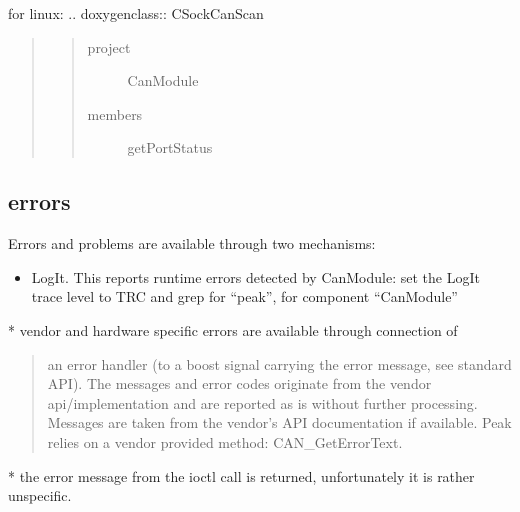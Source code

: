 \documentclass[a4paper,10pt,english]{sphinxmanual}
\begin{document}
\sphinxAtStartPar
for linux:
.. doxygenclass:: CSockCanScan
\begin{quote}
\begin{quote}\begin{description}
\item[{project}] \leavevmode
\sphinxAtStartPar
CanModule

\item[{members}] \leavevmode
\sphinxAtStartPar
getPortStatus

\end{description}\end{quote}
\end{quote}


\subsection{errors}
\label{\detokenize{vendors/peak:errors}}
\sphinxAtStartPar
Errors and problems are available through two mechanisms:
\begin{itemize}
\item {} 
\sphinxAtStartPar
LogIt. This reports runtime errors detected by CanModule:
set the LogIt trace level to TRC and grep for “peak”, for component “CanModule”

\end{itemize}

\sphinxAtStartPar
{}
* vendor and hardware specific errors are available through connection of
\begin{quote}

\sphinxAtStartPar
an error handler (to a boost signal carrying the error message, see standard API).
The messages and error codes originate from the vendor api/implementation and are
reported as is without further processing. Messages are taken from the vendor’s API
documentation if available. Peak relies on a vendor provided method: CAN\_GetErrorText.
\end{quote}

\sphinxAtStartPar
{}
* the error message from the ioctl call is returned, unfortunately it is rather unspecific.
\end{document}
